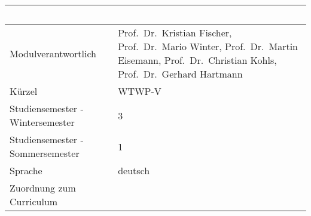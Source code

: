 \begin{longtable}[]{@{}ll@{}}
\toprule
\begin{minipage}[b]{0.12\columnwidth}\raggedright\strut
~\strut
\end{minipage} & \begin{minipage}[b]{0.12\columnwidth}\raggedright\strut
~\strut
\end{minipage}\tabularnewline
\midrule
\endhead
\begin{minipage}[t]{0.12\columnwidth}\raggedright\strut
Modulverantwortlich\strut
\end{minipage} & \begin{minipage}[t]{0.12\columnwidth}\raggedright\strut
Prof.~Dr.~Kristian Fischer, Prof.~Dr.~Mario Winter, Prof.~Dr.~Martin
Eisemann, Prof.~Dr.~Christian Kohls, Prof.~Dr.~Gerhard Hartmann\strut
\end{minipage}\tabularnewline
\begin{minipage}[t]{0.12\columnwidth}\raggedright\strut
Kürzel\strut
\end{minipage} & \begin{minipage}[t]{0.12\columnwidth}\raggedright\strut
WTWP-V\strut
\end{minipage}\tabularnewline
\begin{minipage}[t]{0.12\columnwidth}\raggedright\strut
Studiensemester - Wintersemester\strut
\end{minipage} & \begin{minipage}[t]{0.12\columnwidth}\raggedright\strut
3\strut
\end{minipage}\tabularnewline
\begin{minipage}[t]{0.12\columnwidth}\raggedright\strut
Studiensemester - Sommersemester\strut
\end{minipage} & \begin{minipage}[t]{0.12\columnwidth}\raggedright\strut
1\strut
\end{minipage}\tabularnewline
\begin{minipage}[t]{0.12\columnwidth}\raggedright\strut
Sprache\strut
\end{minipage} & \begin{minipage}[t]{0.12\columnwidth}\raggedright\strut
deutsch\strut
\end{minipage}\tabularnewline
\begin{minipage}[t]{0.12\columnwidth}\raggedright\strut
Zuordnung zum Curriculum\strut
\end{minipage} & \begin{minipage}[t]{0.12\columnwidth}\raggedright\strut

\end{minipage}
\end{longtable}
